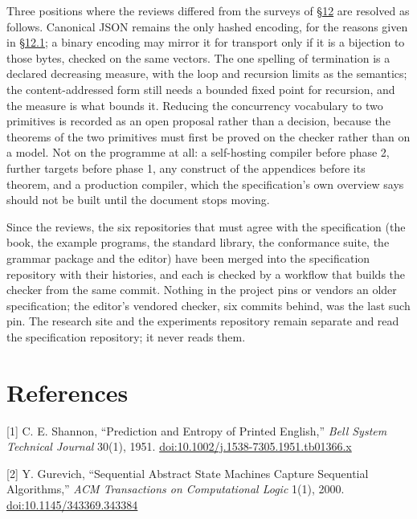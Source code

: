 \documentclass[10pt,letterpaper]{article}
\begin{document}
Three positions where the reviews differed from the surveys of
\href{https://research.openie.dev/papers/rce/\#12-the-form-against-the-record}{§12}
are resolved as follows. Canonical JSON remains the only hashed
encoding, for the reasons given in
\href{https://research.openie.dev/papers/rce/\#121-seven-areas-of-the-design}{§12.1};
a binary encoding may mirror it for transport only if it is a bijection
to those bytes, checked on the same vectors. The one spelling of
termination is a declared decreasing measure, with the loop and
recursion limits as the semantics; the content-addressed form still
needs a bounded fixed point for recursion, and the measure is what
bounds it. Reducing the concurrency vocabulary to two primitives is
recorded as an open proposal rather than a decision, because the
theorems of the two primitives must first be proved on the checker
rather than on a model. Not on the programme at all: a self-hosting
compiler before phase 2, further targets before phase 1, any construct
of the appendices before its theorem, and a production compiler, which
the specification's own overview says should not be built until the
document stops moving.

Since the reviews, the six repositories that must agree with the
specification (the book, the example programs, the standard library, the
conformance suite, the grammar package and the editor) have been merged
into the specification repository with their histories, and each is
checked by a workflow that builds the checker from the same commit.
Nothing in the project pins or vendors an older specification; the
editor's vendored checker, six commits behind, was the last such pin.
The research site and the experiments repository remain separate and
read the specification repository; it never reads them.

\section{References}\label{references}

{[}1{]} C. E. Shannon, ``Prediction and Entropy of Printed English,''
\emph{Bell System Technical Journal} 30(1), 1951.
\href{https://doi.org/10.1002/j.1538-7305.1951.tb01366.x}{doi:10.1002/j.1538-7305.1951.tb01366.x}

{[}2{]} Y. Gurevich, ``Sequential Abstract State Machines Capture
Sequential Algorithms,'' \emph{ACM Transactions on Computational Logic}
1(1), 2000.
\href{https://doi.org/10.1145/343369.343384}{doi:10.1145/343369.343384}
\end{document}
